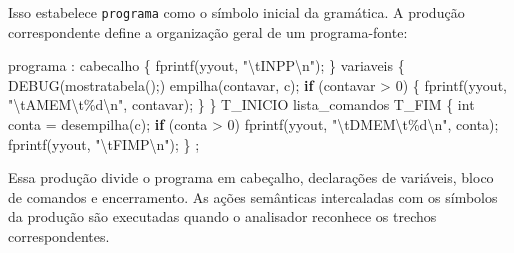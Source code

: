 \documentclass[
  brazilian,
  letterpaper,
]{book}
\newenvironment{Shaded}{\begin{snugshade}}{\end{snugshade}}
\newcommand{\CharTok}[1]{\textcolor[rgb]{0.13,0.47,0.30}{#1}}
\newcommand{\ControlFlowTok}[1]{\textcolor[rgb]{0.00,0.23,0.31}{\textbf{#1}}}
\newcommand{\DataTypeTok}[1]{\textcolor[rgb]{0.68,0.00,0.00}{#1}}
\newcommand{\DecValTok}[1]{\textcolor[rgb]{0.68,0.00,0.00}{#1}}
\newcommand{\NormalTok}[1]{\textcolor[rgb]{0.00,0.23,0.31}{#1}}
\newcommand{\OperatorTok}[1]{\textcolor[rgb]{0.37,0.37,0.37}{#1}}
\newcommand{\SpecialCharTok}[1]{\textcolor[rgb]{0.37,0.37,0.37}{#1}}
\newcommand{\StringTok}[1]{\textcolor[rgb]{0.13,0.47,0.30}{#1}}
\theoremstyle{plain}
\theoremstyle{definition}
\theoremstyle{remark}
\begin{document}
Isso estabelece \texttt{programa} como o símbolo inicial da gramática. A
produção correspondente define a organização geral de um programa-fonte:

\begin{Shaded}
\begin{Highlighting}[]
\NormalTok{programa}
    \OperatorTok{:}\NormalTok{ cabecalho }
         \OperatorTok{\{}\NormalTok{ fprintf}\OperatorTok{(}\NormalTok{yyout}\OperatorTok{,} \StringTok{"}\SpecialCharTok{\textbackslash{}t}\StringTok{INPP}\SpecialCharTok{\textbackslash{}n}\StringTok{"}\OperatorTok{);} \OperatorTok{\}}
\NormalTok{      variaveis }
         \OperatorTok{\{} 
\NormalTok{            DEBUG}\OperatorTok{(}\NormalTok{mostratabela}\OperatorTok{();)}
\NormalTok{            empilha}\OperatorTok{(}\NormalTok{contavar}\OperatorTok{,} \CharTok{\textquotesingle{}c\textquotesingle{}}\OperatorTok{);}
            \ControlFlowTok{if} \OperatorTok{(}\NormalTok{contavar }\OperatorTok{\textgreater{}} \DecValTok{0}\OperatorTok{)} \OperatorTok{\{}
\NormalTok{               fprintf}\OperatorTok{(}\NormalTok{yyout}\OperatorTok{,} \StringTok{"}\SpecialCharTok{\textbackslash{}t}\StringTok{AMEM}\SpecialCharTok{\textbackslash{}t\%d\textbackslash{}n}\StringTok{"}\OperatorTok{,}\NormalTok{ contavar}\OperatorTok{);}
            \OperatorTok{\}} 
         \OperatorTok{\}}
\NormalTok{      T\_INICIO lista\_comandos T\_FIM}
         \OperatorTok{\{}
            \DataTypeTok{int}\NormalTok{ conta }\OperatorTok{=}\NormalTok{ desempilha}\OperatorTok{(}\CharTok{\textquotesingle{}c\textquotesingle{}}\OperatorTok{);}
            \ControlFlowTok{if} \OperatorTok{(}\NormalTok{conta }\OperatorTok{\textgreater{}} \DecValTok{0}\OperatorTok{)} 
\NormalTok{               fprintf}\OperatorTok{(}\NormalTok{yyout}\OperatorTok{,} \StringTok{"}\SpecialCharTok{\textbackslash{}t}\StringTok{DMEM}\SpecialCharTok{\textbackslash{}t\%d\textbackslash{}n}\StringTok{"}\OperatorTok{,}\NormalTok{ conta}\OperatorTok{);}
\NormalTok{            fprintf}\OperatorTok{(}\NormalTok{yyout}\OperatorTok{,} \StringTok{"}\SpecialCharTok{\textbackslash{}t}\StringTok{FIMP}\SpecialCharTok{\textbackslash{}n}\StringTok{"}\OperatorTok{);} 
         \OperatorTok{\}}
    \OperatorTok{;}
\end{Highlighting}
\end{Shaded}

Essa produção divide o programa em cabeçalho, declarações de variáveis,
bloco de comandos e encerramento. As ações semânticas intercaladas com
os símbolos da produção são executadas quando o analisador reconhece os
trechos correspondentes.
\end{document}

